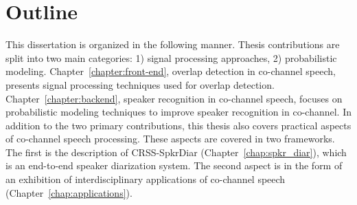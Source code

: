 \section{Outline}
\label{sec:intro_outline}
This dissertation is organized in the following manner. 
Thesis contributions are split into two main categories: 1) signal processing approaches, 2) probabilistic modeling. 
Chapter~\ref{chapter:front-end}, overlap detection in co-channel speech, presents signal processing techniques used for overlap detection. 
Chapter~\ref{chapter:backend}, speaker recognition in co-channel speech, focuses on probabilistic modeling techniques to improve speaker recognition in co-channel. 
In addition to the two primary contributions, this thesis also covers practical aspects of co-channel speech processing. 
These aspects are covered in two frameworks. 
The first is the description of CRSS-SpkrDiar (Chapter~\ref{chap:spkr_diar}), which is an end-to-end speaker diarization system. 
The second aspect is in the form of an exhibition of interdisciplinary applications of co-channel speech (Chapter~\ref{chap:applications}). 

